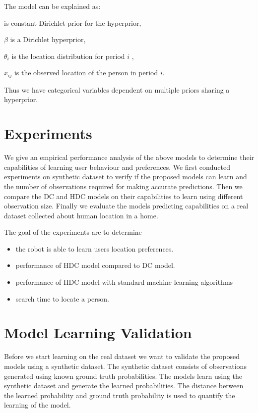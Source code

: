 The model can be explained as:

	\boldmath{$\alpha$} is  constant Dirichlet prior for the hyperprior, 
	
	$\beta$ is a Dirichlet hyperprior,
	
	$\theta_i$ is the location distribution for period $i$  ,
	
	$x_{ij}$ is the observed location of the person in period $i$.
	
Thus we have categorical variables dependent on multiple priors sharing a hyperprior.


\section{Experiments}

We give an empirical performance analysis of the above models to determine their capabilities of learning user behaviour and preferences. We first conducted experiments on synthetic dataset to verify if the proposed models can learn and the number of observations required for making accurate predictions. Then we compare the DC and HDC models on their capabilities to learn using different observation size. Finally we evaluate the models predicting capabilities on a real dataset collected about human location in a home.

The goal of the experiments are to determine 
\begin{itemize}
	\item the robot is able to learn users location preferences.
	\item performance of HDC model compared to DC model.
	\item performance of HDC model with standard machine learning algorithms
	\item search time to locate a person.
\end{itemize}


\section{Model Learning Validation}

Before we start learning on the real dataset we want to validate the proposed models using a synthetic dataset. The synthetic dataset consists of observations generated using known ground truth probabilities. The models learn using the synthetic dataset and generate the learned probabilities. The distance between the learned probability and ground truth probability is used to quantify the learning of the model. 

